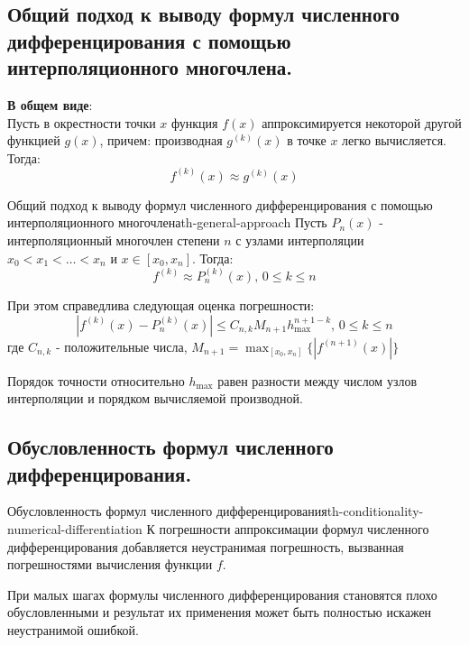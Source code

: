 \documentclass[14pt]{extarticle}
\begin{document}
\clearpage
\subsection{Общий подход к выводу формул численного дифференцирования с помощью интерполяционного многочлена.}

    \textbf{В общем виде}:\\
    Пусть в окрестности точки $x$ функция $f(x)$ аппроксимируется некоторой другой функцией $g(x)$, причем: производная $g^{(k)}(x)$ в точке $x$ легко вычисляется. Тогда:
    $$f^{(k)}(x) \approx g^{(k)}(x)$$

    \begin{theorem}{Общий подход к выводу формул численного дифференцирования с помощью интерполяционного многочлена}{th-general-approach}
        Пусть $P_{n}(x)$ - интерполяционный многочлен степени $n$ с узлами интерполяции $x_{0} < x_{1} < \ldots < x_{n}$ и $x \in [x_{0}, x_{n}]$. Тогда:
        $$f^{(k)} \approx P_{n}^{(k)}(x) \text{, } 0 \leq k \leq n$$

        При этом справедлива следующая оценка погрешности:
        $$|f^{(k)}(x) - P_{n}^{(k)}(x)| \leq C_{n, k}M_{n+1}h_{\max}^{n + 1 - k} \text{, } 0 \leq k \leq n$$
        где $C_{n, k}$ - положительные числа, $M_{n+1} = \max_{[x_{0}, x_{n}]}\{|f^{(n+1)}(x)|\}$
    \end{theorem}

    Порядок точности относительно $h_{\max}$ равен разности между числом узлов интерполяции и порядком вычисляемой производной.

\clearpage
\subsection{Обусловленность формул численного дифференцирования.}

    \begin{theorem}{Обусловленность формул численного дифференцирования}{th-conditionality-numerical-differentiation}
        К погрешности аппроксимации формул численного дифференцирования добавляется неустранимая погрешность, вызванная погрешностями вычисления функции $f$. 
        
        \vspace{\baselineskip}

        При малых шагах формулы численного дифференцирования становятся плохо обусловленными и результат их применения может быть полностью искажен неустранимой ошибкой.
    \end{theorem}
\end{document}
